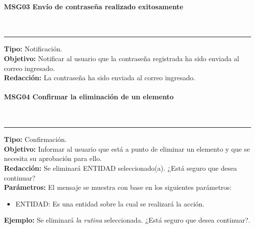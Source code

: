 \paragraph{\textcolor[rgb]{0, 0, 0.545098}{MSG03 Envío de contraseña realizado exitosamente}} \hspace{1cm} \\
\label{msj:MSG03}
\rule[3mm]{16.59cm}{0.1mm} \vspace{1mm}
\textbf{Tipo:} Notificación.\\
\textbf{Objetivo:} Notificar al usuario que la contraseña registrada ha sido enviada al correo ingresado.\\
\textbf{Redacción:} La contraseña ha sido enviada al correo ingresado.\\

\paragraph{\textcolor[rgb]{0, 0, 0.545098}{MSG04 Confirmar la eliminación de un elemento}} \hspace{1cm} \\
\label{msj:MSG04}
\rule[3mm]{16.59cm}{0.1mm} \vspace{1mm}
\textbf{Tipo:} Confirmación.\\
\textbf{Objetivo:} Informar al usuario que está a punto de eliminar un elemento y que se necesita su aprobación para ello.\\
\textbf{Redacción:} Se eliminará ENTIDAD seleccionado(a). ¿Está seguro que desea continuar?\\
\textbf{Parámetros:} El mensaje se muestra con base en los siguientes parámetros:
\begin{itemize} \itemsep1pt \parskip0pt 
	\item ENTIDAD: Es una entidad sobre la cual se realizará la acción.
\end{itemize}
\textbf{Ejemplo:} Se eliminará \textit{la rutina} seleccionada. ¿Está seguro que desea continuar?.\\

